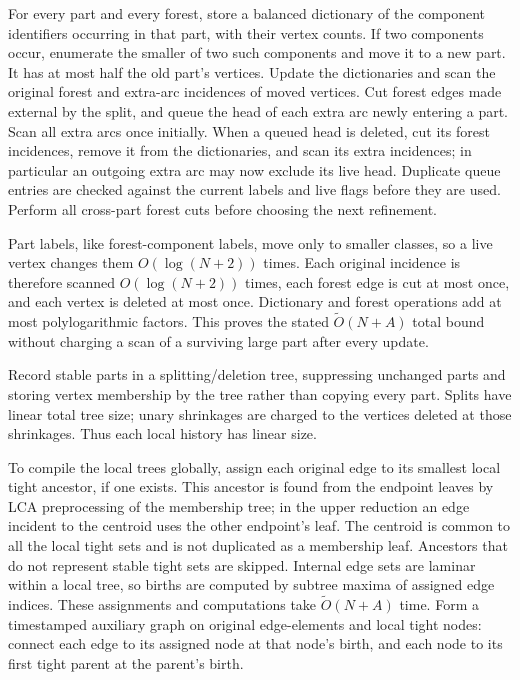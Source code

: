\documentclass[11pt,a4paper]{article}
\theoremstyle{definition}
\theoremstyle{remark}
\newcommand{\softO}{\widetilde O}
\begin{document}
For every part and every forest, store a balanced dictionary of
the component identifiers occurring in that part, with their
vertex counts. If two components occur, enumerate the smaller
of two such components and move it to a new part. It has at most
half the old part's vertices. Update the dictionaries and scan
the original forest and extra-arc incidences of moved vertices.
Cut forest edges made external by the split, and queue the head
of each extra arc newly entering a part. Scan all extra arcs once
initially. When a queued head is deleted, cut its forest
incidences, remove it from the dictionaries, and scan its extra
incidences; in particular an outgoing extra arc may now exclude
its live head. Duplicate queue entries are checked against the
current labels and live flags before they are used. Perform all
cross-part forest cuts before choosing the next refinement.

Part labels, like forest-component labels, move only to smaller
classes, so a live vertex changes them $O(\log(N+2))$ times.
Each original incidence is therefore scanned
$O(\log(N+2))$ times, each forest edge is cut at most once,
and each vertex is deleted at most once. Dictionary and forest
operations add at most polylogarithmic factors. This proves
the stated $\softO(N+A)$ total bound without charging a scan of
a surviving large part after every update.

Record stable parts in a splitting/deletion tree, suppressing
unchanged parts and storing vertex membership by the tree rather
than copying every part. Splits have linear total tree size;
unary shrinkages are charged to the vertices deleted at those
shrinkages. Thus each local history has linear size.

To compile the local trees globally, assign each original edge
to its smallest local tight ancestor, if one exists. This ancestor
is found from the endpoint leaves by LCA preprocessing of the
membership tree; in the upper reduction an edge incident to the
centroid uses the other endpoint's leaf. The centroid is common
to all the local tight sets and is not duplicated as a membership
leaf. Ancestors that do not represent stable tight sets are
skipped. Internal edge sets are laminar within a local tree,
so births are computed by subtree maxima of assigned edge indices.
These assignments and computations take $\softO(N+A)$ time.
Form a timestamped auxiliary graph on original
edge-elements and local tight nodes: connect each edge to
its assigned node at that node's birth, and each node to
its first tight parent at the parent's birth.
\end{document}
